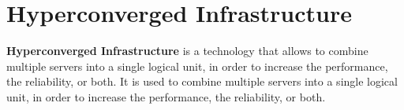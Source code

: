 \section{Hyperconverged Infrastructure}
\textbf{Hyperconverged Infrastructure} is a technology that allows to combine multiple servers into a single logical unit, in order to increase the performance, the reliability, or both. It is used to combine multiple servers into a single logical unit, in order to increase the performance, the reliability, or both.
